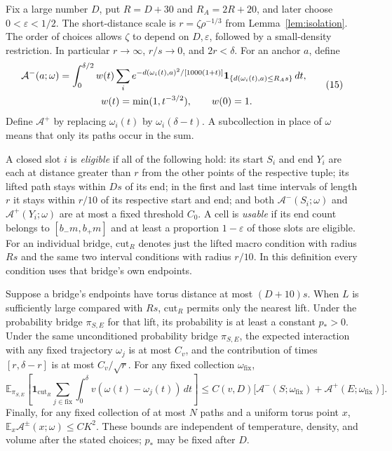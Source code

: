 Fix a large number $D$, put $R=D+30$ and $R_A=2R+20$, and later
choose $0<\varepsilon<1/2$. The short-distance scale is
$r=\zeta\rho^{-1/3}$ from Lemma~\ref{lem:isolation}. The order of
choices allows $\zeta$ to depend on $D,\varepsilon$, followed by
a small-density restriction. In particular $r\to\infty$,
$r/s\to0$, and $2r<\delta$.
For an anchor $a$, define
\begin{equation}
 \begin{aligned}
 \mathcal A^-(a;\omega)&=\int_0^{\delta/2}w(t)
 \sum_i e^{-d(\omega_i(t),a)^2/[1000(1+t)]}
 \mathbf1_{\{d(\omega_i(t),a)\leq R_As\}}\,dt,\\
 &\hspace{15mm}w(t)=\min(1,t^{-3/2}),\qquad w(0)=1.
 \end{aligned}
 \tag{15}\label{eq:15}
\end{equation}
Define $\mathcal A^+$ by replacing $\omega_i(t)$ by
$\omega_i(\delta-t)$. A subcollection in place of $\omega$ means
that only its paths occur in the sum.

A closed slot $i$ is \emph{eligible} if all of the following hold:
its start $S_i$ and end $Y_i$ are each at distance greater than $r$
from the other points of the respective tuple; its lifted path
stays within $Ds$ of its end; in the first and last time intervals
of length $r$ it stays within $r/10$ of its respective start and
end; and both $\mathcal A^-(S_i;\omega)$ and
$\mathcal A^+(Y_i;\omega)$ are at most a fixed threshold $C_0$.
A cell is \emph{usable} if its end count belongs to
$[b_-m,b_+m]$ and at least a proportion $1-\varepsilon$ of those
slots are eligible.
For an individual bridge, $\mathrm{cut}_R$ denotes just the lifted
macro condition with radius $Rs$ and the same two interval
conditions with radius $r/10$. In this definition every condition
uses that bridge's own endpoints.

\begin{lemma}\label{lem:single-bridge}
Suppose a bridge's endpoints have torus distance at most
$(D+10)s$. When $L$ is sufficiently large compared with $Rs$,
$\mathrm{cut}_R$ permits only the nearest lift. Under the probability
bridge $\pi_{S,E}$ for that lift, its probability is at least a
constant $p_*>0$. Under the same unconditioned probability bridge
$\pi_{S,E}$, the expected interaction with any fixed trajectory
$\omega_j$ is at most $C_v$, and the contribution
of times $[r,\delta-r]$ is at most $C_v/\sqrt r$.
For any fixed collection $\omega_{\mathrm{fix}}$,
\begin{equation}
 \mathbb E_{\pi_{S,E}}\left[
 \mathbf1_{\mathrm{cut}_R}
 \sum_{j\in\mathrm{fix}}\int_0^\delta
 v(\omega(t)-\omega_j(t))\,dt\right]
 \leq C(v,D)\bigl[
 \mathcal A^-(S;\omega_{\mathrm{fix}})+
 \mathcal A^+(E;\omega_{\mathrm{fix}})\bigr].
 \tag{16}\label{eq:16}
\end{equation}
Finally, for any fixed collection of at most $N$ paths and a
uniform torus point $x$,
$\mathbb E_x\mathcal A^\pm(x;\omega)\leq CK^2$.
These bounds are independent of temperature, density, and volume
after the stated choices; $p_*$ may be fixed after $D$.
\end{lemma}

